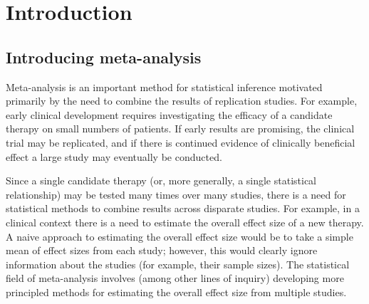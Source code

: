 \documentclass[fleqn,10pt]{SelfArx} %
\begin{document}
\flushbottom %

\maketitle %

\tableofcontents %

\thispagestyle{empty} %


\section{Introduction} %

\subsection*{Introducing meta-analysis}

Meta-analysis is an important method for statistical inference motivated primarily by the need to combine the results of replication studies. For example, early clinical development requires investigating the efficacy of a candidate therapy on small numbers of patients. If early results are promising, the clinical trial may be replicated, and if there is continued evidence of clinically beneficial effect a large study may eventually be conducted. 

Since a single candidate therapy (or, more generally, a single statistical relationship) may be tested many times over many studies, there is a need for statistical methods to combine results across disparate studies. For example, in a clinical context there is a need to estimate the overall effect size of a new therapy. A naive approach to estimating the overall effect size would be to take a simple mean of effect sizes from each study; however, this would clearly ignore information about the studies (for example, their sample sizes). The statistical field of meta-analysis involves (among other lines of inquiry) developing more principled methods for estimating the overall effect size from multiple studies.
\end{document}
